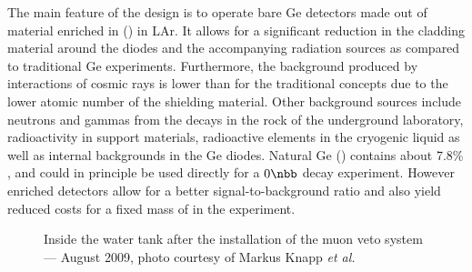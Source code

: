  The main feature of the {\gerda} design is to operate bare Ge detectors made out of material enriched in  () in LAr. It allows for a significant reduction in the cladding material around the diodes and the accompanying radiation sources as compared to traditional Ge experiments. Furthermore, the background produced by interactions of cosmic rays is lower than for the traditional concepts due to the lower atomic number of the shielding material. Other background sources include neutrons and gammas from the decays in the rock of the underground laboratory, radioactivity in support materials, radioactive elements in the cryogenic liquid as well as internal backgrounds in the Ge diodes. Natural Ge () contains about 7.8\% , and could in principle be used directly for a $0\nbb$ decay experiment. However enriched detectors allow for a better signal-to-background ratio and also yield reduced costs for a fixed mass of  in the experiment.
\begin{figure}
	\centering
	\caption{Inside the water tank after the installation of the muon veto system --- August 2009, photo courtesy of Markus Knapp \emph{et al.}}\label{fig:muonveto}
\end{figure}
